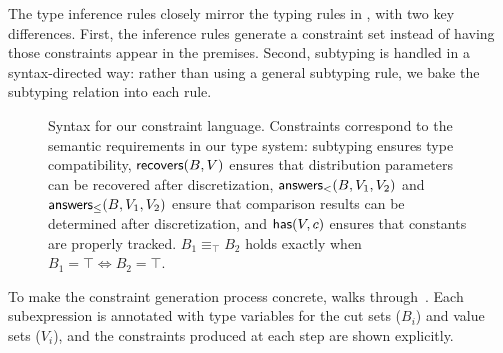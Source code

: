 The type inference rules closely mirror the typing rules in , with two key differences. First, the inference rules generate a constraint set instead of having those constraints appear in the premises. Second, subtyping is handled in a syntax-directed way: rather than using a general subtyping rule, we bake the subtyping relation into each rule.

\begin{figure}[!t]
\caption{Syntax for our constraint language. Constraints correspond to the semantic requirements in our type system: subtyping ensures type compatibility, $\mathsf{recovers}(B, V)$ ensures that distribution parameters can be recovered after discretization, $\mathsf{answers}_<(B, V_1, V_2)$ and $\mathsf{answers}_{\leq}(B, V_1, V_2)$ ensure that comparison results can be determined after discretization, and $\mathsf{has}(V, c)$ ensures that constants are properly tracked. $B_1 \equiv_{\top} B_2$ holds exactly when $B_1 = \top \iff B_2 = \top$.}
\label{fig:constraints-grammar}
\end{figure}



\begin{example}
  To make the constraint generation process concrete,  walks through~. Each subexpression is annotated with type variables for the cut sets ($B_i$) and value sets ($V_i$), and the constraints produced at each step are shown explicitly.
\end{example}

